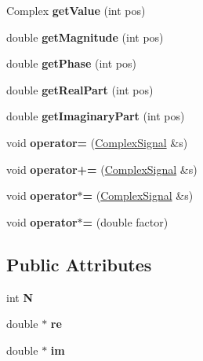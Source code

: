 \begin{DoxyCompactItemize}
\item 
\mbox{\label{class_complex_signal_a67a1f39d7ce00d60878a525b70175db2}} 
Complex {\bfseries get\+Value} (int pos)
\item 
\mbox{\label{class_complex_signal_a930d559a5257a946c8e0ac6961270c08}} 
double {\bfseries get\+Magnitude} (int pos)
\item 
\mbox{\label{class_complex_signal_ae797fb7be3d1a29b3c0add56a777156e}} 
double {\bfseries get\+Phase} (int pos)
\item 
\mbox{\label{class_complex_signal_aca1355defbbc939271753e14a607e5c2}} 
double {\bfseries get\+Real\+Part} (int pos)
\item 
\mbox{\label{class_complex_signal_a7a83ecf392f991f4279897834e97f412}} 
double {\bfseries get\+Imaginary\+Part} (int pos)
\item 
\mbox{\label{class_complex_signal_a01c224d76fa35a6df3cea9ddc30b0506}} 
void {\bfseries operator=} (\mbox{\hyperlink{class_complex_signal}{Complex\+Signal}} \&s)
\item 
\mbox{\label{class_complex_signal_aeec2bb0e77beeb2f3923be1800a2c88d}} 
void {\bfseries operator+=} (\mbox{\hyperlink{class_complex_signal}{Complex\+Signal}} \&s)
\item 
\mbox{\label{class_complex_signal_ab6d566160046898c1930fad41ec2d897}} 
void {\bfseries operator$\ast$=} (\mbox{\hyperlink{class_complex_signal}{Complex\+Signal}} \&s)
\item 
\mbox{\label{class_complex_signal_ae26afe43ade331ad84ce804325970ec4}} 
void {\bfseries operator$\ast$=} (double factor)
\end{DoxyCompactItemize}
\subsection*{Public Attributes}
\begin{DoxyCompactItemize}
\item 
\mbox{\label{class_complex_signal_ad8259241613c6c824ecc4715b1abcd5d}} 
int {\bfseries N}
\item 
\mbox{\label{class_complex_signal_a002adf7e8e3818c60907d70343229c75}} 
double $\ast$ {\bfseries re}
\item 
\mbox{\label{class_complex_signal_a0513e30979403998d4ba1f2ae8e22042}} 
double $\ast$ {\bfseries im}
\end{DoxyCompactItemize}


